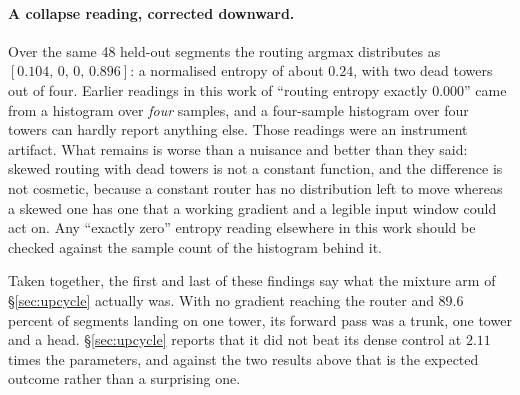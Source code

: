 \documentclass[11pt]{article}
\begin{document}
\paragraph{A collapse reading, corrected downward.} Over the same 48 held-out segments the routing argmax distributes as $[0.104,\, 0,\, 0,\, 0.896]$: a normalised entropy of about $0.24$, with two dead towers out of four. Earlier readings in this work of ``routing entropy exactly $0.000$'' came from a histogram over \emph{four} samples, and a four-sample histogram over four towers can hardly report anything else. Those readings were an instrument artifact. What remains is worse than a nuisance and better than they said: skewed routing with dead towers is not a constant function, and the difference is not cosmetic, because a constant router has no distribution left to move whereas a skewed one has one that a working gradient and a legible input window could act on. Any ``exactly zero'' entropy reading elsewhere in this work should be checked against the sample count of the histogram behind it.

Taken together, the first and last of these findings say what the mixture arm of \S\ref{sec:upcycle} actually was. With no gradient reaching the router and 89.6 percent of segments landing on one tower, its forward pass was a trunk, one tower and a head. \S\ref{sec:upcycle} reports that it did not beat its dense control at $2.11$ times the parameters, and against the two results above that is the expected outcome rather than a surprising one.
\end{document}

